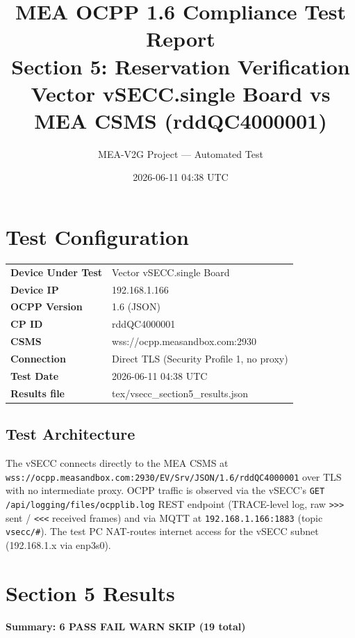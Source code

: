 \documentclass[10pt, a4paper]{article}
\title{\textbf{MEA OCPP 1.6 Compliance Test Report}\\[0.3em]
\large Section 5: Reservation Verification\\[0.3em]
\normalsize Vector vSECC.single Board vs MEA CSMS (rddQC4000001)}
\author{MEA-V2G Project --- Automated Test}
\date{2026-06-11 04:38 UTC}
\begin{document}
\maketitle
\tableofcontents
\newpage

\section{Test Configuration}
\begin{tabular}{ll}
\textbf{Device Under Test} & Vector vSECC.single Board \\
\textbf{Device IP}         & 192.168.1.166 \\
\textbf{OCPP Version}      & 1.6 (JSON) \\
\textbf{CP ID}             & rddQC4000001 \\
\textbf{CSMS}              & wss://ocpp.measandbox.com:2930 \\
\textbf{Connection}        & Direct TLS (Security Profile 1, no proxy) \\
\textbf{Test Date}         & 2026-06-11 04:38 UTC \\
\textbf{Results file}      & tex/vsecc\_section5\_results.json \\
\end{tabular}

\subsection*{Test Architecture}
The vSECC connects directly to the MEA CSMS at
\texttt{wss://ocpp.measandbox.com:2930/EV/Srv/JSON/1.6/rddQC4000001}
over TLS with no intermediate proxy.
OCPP traffic is observed via the vSECC's \texttt{GET /api/logging/files/ocpplib.log}
REST endpoint (TRACE-level log, raw \texttt{>>>} sent / \texttt{<<<} received frames)
and via MQTT at \texttt{192.168.1.166:1883} (topic \texttt{vsecc/\#}).
The test PC NAT-routes internet access for the vSECC subnet (192.168.1.x via enp3s0).

\section{Section 5 Results}
\textbf{Summary: 6 PASS  FAIL  WARN  SKIP \quad (19 total)}
\end{document}
